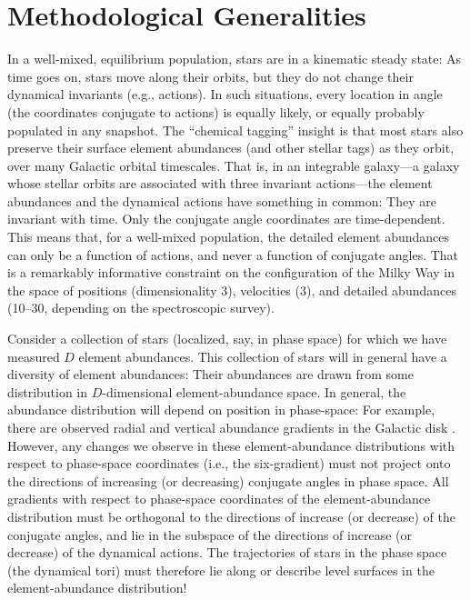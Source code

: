 \documentclass[modern]{aastex63}
\begin{document}
\section{Methodological Generalities}
\label{sec:generalities}

In a well-mixed, equilibrium population, stars are in a kinematic steady state:
As time goes on, stars move along their orbits, but they do not change their
dynamical invariants (e.g., actions).
In such situations, every location in angle (the coordinates conjugate to
actions) is equally likely, or equally probably populated in any snapshot.
The ``chemical tagging'' insight \citep{Freeman:2002} is that most stars also
preserve their surface element abundances (and other stellar tags) as they
orbit, over many Galactic orbital timescales.
That is, in an integrable galaxy---a galaxy whose stellar orbits are associated
with three invariant actions---the element abundances and the dynamical actions
have something in common: They are invariant with time.
Only the conjugate angle coordinates are time-dependent.
This means that, for a well-mixed population, the detailed element abundances
can only be a function of actions, and never a function of conjugate angles.
That is a remarkably informative constraint on the configuration of the Milky
Way in the space of positions (dimensionality 3), velocities (3), and
detailed abundances (10--30, depending on the spectroscopic survey).

Consider a collection of stars (localized, say, in phase space) for which we
have measured $D$ element abundances.
This collection of stars will in general have a diversity of element abundances:
Their abundances are drawn from some distribution in $D$-dimensional
element-abundance space.
In general, the abundance distribution will depend on position in phase-space:
For example, there are observed radial and vertical abundance gradients in the
Galactic disk \citep{people}.
However, any changes we observe in these element-abundance distributions with
respect to phase-space coordinates (i.e., the six-gradient) must not project
onto the directions of increasing (or decreasing) conjugate angles in phase
space.
All gradients with respect to phase-space coordinates of the element-abundance
distribution must be orthogonal to the directions of increase (or decrease) of
the conjugate angles, and lie in the subspace of the directions of increase (or
decrease) of the dynamical actions.
The trajectories of stars in the phase space (the dynamical tori) must therefore
lie along or describe level surfaces in the element-abundance distribution!
\end{document}
